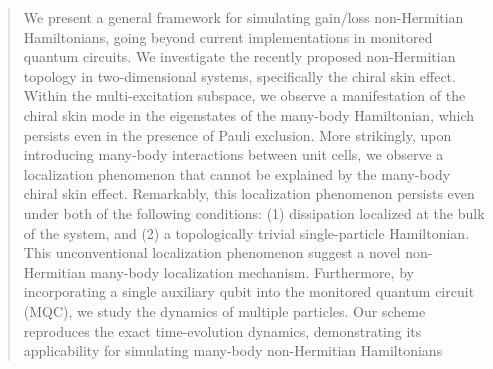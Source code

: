 \documentclass[longbibliography, aps, prx, amsmath, amssymb, amsfonts, twocolumn,superscriptaddress, footinbib]{revtex4-1}
\begin{document}
\begin{abstract}
		We present a general framework for simulating gain/loss non-Hermitian Hamiltonians, going beyond current implementations in monitored quantum circuits. We investigate the recently proposed non-Hermitian topology in two-dimensional systems, specifically the chiral skin effect. Within the multi-excitation subspace, we observe a manifestation of the chiral skin mode in the eigenstates of the many-body Hamiltonian, which persists even in the presence of Pauli exclusion. More strikingly, upon introducing many-body interactions between unit cells, we observe a localization phenomenon that cannot be explained by the many-body chiral skin effect.
		Remarkably, this localization phenomenon persists even under both of the following conditions: (1) dissipation localized at the bulk of the system, and (2) a topologically trivial single-particle Hamiltonian. This unconventional localization phenomenon suggest a novel non-Hermitian many-body localization mechanism.
		Furthermore, by incorporating a single auxiliary qubit into the monitored quantum circuit (MQC), we study the dynamics of multiple particles. Our scheme reproduces the exact time-evolution dynamics, demonstrating its applicability for simulating many-body non-Hermitian Hamiltonians




	\end{abstract}
	
\end{document}
